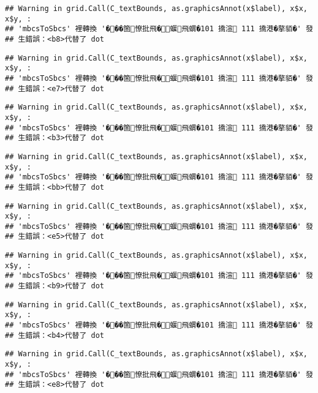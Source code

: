 \documentclass[
]{article}
\begin{document}
\begin{verbatim}
## Warning in grid.Call(C_textBounds, as.graphicsAnnot(x$label), x$x, x$y, :
## 'mbcsToSbcs' 裡轉換 '���箇憭批飛�蝘飛蝟�101 撟渲 111 撟港�摮貊�' 發
## 生錯誤：<b8>代替了 dot
\end{verbatim}

\begin{verbatim}
## Warning in grid.Call(C_textBounds, as.graphicsAnnot(x$label), x$x, x$y, :
## 'mbcsToSbcs' 裡轉換 '���箇憭批飛�蝘飛蝟�101 撟渲 111 撟港�摮貊�' 發
## 生錯誤：<e7>代替了 dot
\end{verbatim}

\begin{verbatim}
## Warning in grid.Call(C_textBounds, as.graphicsAnnot(x$label), x$x, x$y, :
## 'mbcsToSbcs' 裡轉換 '���箇憭批飛�蝘飛蝟�101 撟渲 111 撟港�摮貊�' 發
## 生錯誤：<b3>代替了 dot
\end{verbatim}

\begin{verbatim}
## Warning in grid.Call(C_textBounds, as.graphicsAnnot(x$label), x$x, x$y, :
## 'mbcsToSbcs' 裡轉換 '���箇憭批飛�蝘飛蝟�101 撟渲 111 撟港�摮貊�' 發
## 生錯誤：<bb>代替了 dot
\end{verbatim}

\begin{verbatim}
## Warning in grid.Call(C_textBounds, as.graphicsAnnot(x$label), x$x, x$y, :
## 'mbcsToSbcs' 裡轉換 '���箇憭批飛�蝘飛蝟�101 撟渲 111 撟港�摮貊�' 發
## 生錯誤：<e5>代替了 dot
\end{verbatim}

\begin{verbatim}
## Warning in grid.Call(C_textBounds, as.graphicsAnnot(x$label), x$x, x$y, :
## 'mbcsToSbcs' 裡轉換 '���箇憭批飛�蝘飛蝟�101 撟渲 111 撟港�摮貊�' 發
## 生錯誤：<b9>代替了 dot
\end{verbatim}

\begin{verbatim}
## Warning in grid.Call(C_textBounds, as.graphicsAnnot(x$label), x$x, x$y, :
## 'mbcsToSbcs' 裡轉換 '���箇憭批飛�蝘飛蝟�101 撟渲 111 撟港�摮貊�' 發
## 生錯誤：<b4>代替了 dot
\end{verbatim}

\begin{verbatim}
## Warning in grid.Call(C_textBounds, as.graphicsAnnot(x$label), x$x, x$y, :
## 'mbcsToSbcs' 裡轉換 '���箇憭批飛�蝘飛蝟�101 撟渲 111 撟港�摮貊�' 發
## 生錯誤：<e8>代替了 dot
\end{verbatim}
\end{document}
